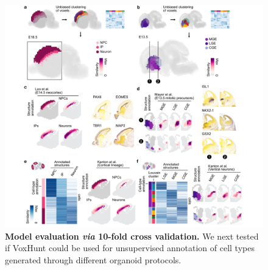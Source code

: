 \begin{figure}[b!]
    \centering
	\includegraphics[width=\textwidth]{figures/voxhunt/Figure_5}
    \caption{\textbf{Model evaluation \textit{via} 10-fold cross validation.} We next tested if VoxHunt could be used for unsupervised annotation of cell types generated through different organoid protocols.}
    \label{fig:vox5}
\end{figure}




